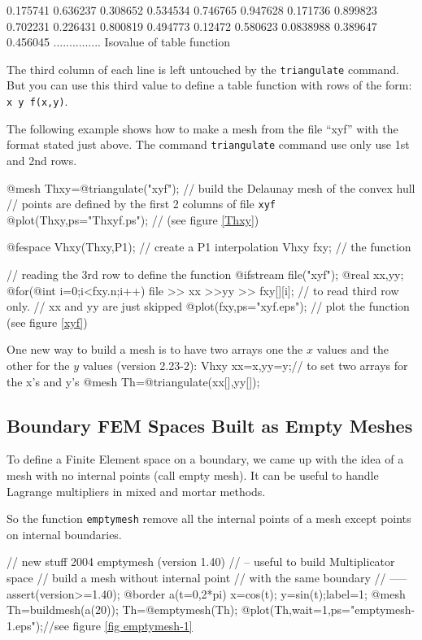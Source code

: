 \documentclass[a4paper,twoside,12pt]{book}
\begin{document}
 0.175741 0.636237
0.308652 0.534534 0.746765
0.947628 0.171736 0.899823
0.702231 0.226431 0.800819
0.494773 0.12472 0.580623
0.0838988 0.389647 0.456045
...............
\eFF
{Isovalue of table function}

The third column of each line is left untouched by the
\texttt{triangulate} command. But you can use this third value to
define a table function with rows of the form: \texttt{x y f(x,y)}.


The following example shows how to make a mesh from the file ``xyf''
with the format stated just above.
The command
\texttt{triangulate} command use only use 1st and 2nd rows.


\bFF
@mesh Thxy=@triangulate("xyf"); // build the Delaunay mesh of the convex hull
// points are defined by the first 2 columns of file \texttt{xyf}
@plot(Thxy,ps="Thxyf.ps"); // (see figure  \ref{Thxy})

@fespace Vhxy(Thxy,P1); // create a P1 interpolation
Vhxy fxy; // the function

// reading the 3rd row to define the function
{ @ifstream file("xyf");
   @real xx,yy;
   @for(@int i=0;i<fxy.n;i++)
   file >> xx >>yy >> fxy[][i];  // to read third row only.
   // xx and yy are just skipped
}
@plot(fxy,ps="xyf.eps"); // plot the function (see figure  \ref{xyf})
\eFF

One  new way to build a mesh is to have two arrays one  the $x$ values and the other for the $y$ values (version 2.23-2):
\bFF
Vhxy xx=x,yy=y;// to set two arrays for the x's and y's
@mesh Th=@triangulate(xx[],yy[]);
\eFF

\subsection{Boundary FEM Spaces Built as Empty Meshes}
To define a Finite Element space on a boundary,
we came up with the idea of a mesh with no internal points (call empty mesh).
It can be useful to handle Lagrange multipliers in mixed and mortar methods.

So the function \texttt{emptymesh} remove all the internal points of a mesh except
points  on  internal boundaries.

\bFF
{  //  new stuff 2004 emptymesh (version 1.40)
 // -- useful to build Multiplicator space
 //  build a mesh without internal point
 // with the same boundary
 //  -----
  assert(version>=1.40);
  @border a(t=0,2*pi){ x=cos(t); y=sin(t);label=1;}
  @mesh Th=buildmesh(a(20));
   Th=@emptymesh(Th);
  @plot(Th,wait=1,ps="emptymesh-1.eps");//see figure \ref{fig emptymesh-1}
}
\eFF
\end{document}
